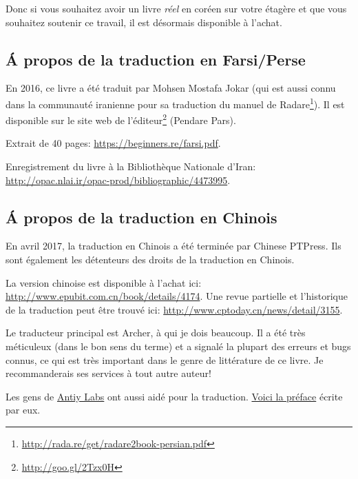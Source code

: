 Donc si vous souhaitez avoir un livre \emph{réel} en coréen sur votre étagère et que vous souhaitez soutenir ce travail, il est désormais disponible à l'achat.

\subsection*{Á propos de la traduction en Farsi/Perse}

En 2016, ce livre a été traduit par Mohsen Mostafa Jokar (qui est aussi connu dans
la communauté iranienne pour sa traduction du manuel de Radare\footnote{\url{http://rada.re/get/radare2book-persian.pdf}}).
Il est disponible sur le site web de l'éditeur\footnote{\url{http://goo.gl/2Tzx0H}}
(Pendare Pars).

Extrait de 40 pages: \url{https://beginners.re/farsi.pdf}.

Enregistrement du livre à la Bibliothèque Nationale d'Iran: \url{http://opac.nlai.ir/opac-prod/bibliographic/4473995}.

\subsection*{Á propos de la traduction en Chinois}

En avril 2017, la traduction en Chinois a été terminée par Chinese PTPress. Ils sont
également les détenteurs des droits de la traduction en Chinois.

La version chinoise est disponible à l'achat ici: \url{http://www.epubit.com.cn/book/details/4174}.
Une revue partielle et l'historique de la traduction peut être trouvé ici: \url{http://www.cptoday.cn/news/detail/3155}.


Le traducteur principal est Archer, à qui je dois beaucoup. Il a été très méticuleux
(dans le bon sens du terme) et a signalé la plupart des erreurs et bugs connus, ce
qui est très important dans le genre de littérature de ce livre.
Je recommanderais ses services à tout autre auteur!

Les gens de \href{http://www.antiy.net/}{Antiy Labs} ont aussi aidé pour la traduction.
\href{http://www.epubit.com.cn/book/onlinechapter/51413}{Voici la préface} écrite par eux.

